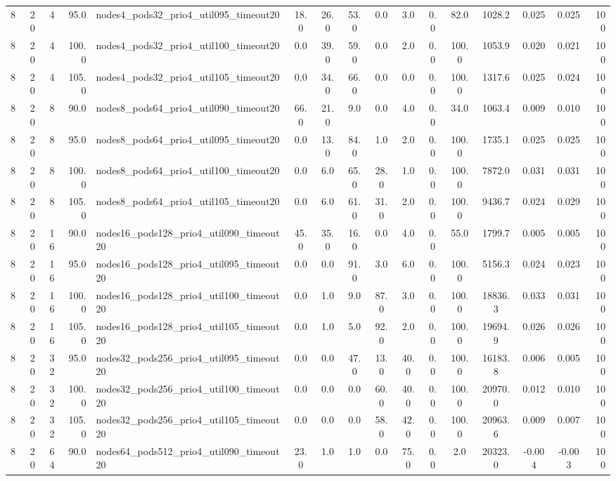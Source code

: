 \begin{tabular}{r r r r l c c c c c c c c c c r}
8 & 20 & 4 & 95.0 & nodes4\_pods32\_prio4\_util095\_timeout20 & 18.0 & 26.0 & 53.0 & 0.0 & 3.0 & 0.0 & 82.0 & 1028.2 & 0.025 & 0.025 & 100 \\
8 & 20 & 4 & 100.0 & nodes4\_pods32\_prio4\_util100\_timeout20 & 0.0 & 39.0 & 59.0 & 0.0 & 2.0 & 0.0 & 100.0 & 1053.9 & 0.020 & 0.021 & 100 \\
8 & 20 & 4 & 105.0 & nodes4\_pods32\_prio4\_util105\_timeout20 & 0.0 & 34.0 & 66.0 & 0.0 & 0.0 & 0.0 & 100.0 & 1317.6 & 0.025 & 0.024 & 100 \\
8 & 20 & 8 & 90.0 & nodes8\_pods64\_prio4\_util090\_timeout20 & 66.0 & 21.0 & 9.0 & 0.0 & 4.0 & 0.0 & 34.0 & 1063.4 & 0.009 & 0.010 & 100 \\
8 & 20 & 8 & 95.0 & nodes8\_pods64\_prio4\_util095\_timeout20 & 0.0 & 13.0 & 84.0 & 1.0 & 2.0 & 0.0 & 100.0 & 1735.1 & 0.025 & 0.025 & 100 \\
8 & 20 & 8 & 100.0 & nodes8\_pods64\_prio4\_util100\_timeout20 & 0.0 & 6.0 & 65.0 & 28.0 & 1.0 & 0.0 & 100.0 & 7872.0 & 0.031 & 0.031 & 100 \\
8 & 20 & 8 & 105.0 & nodes8\_pods64\_prio4\_util105\_timeout20 & 0.0 & 6.0 & 61.0 & 31.0 & 2.0 & 0.0 & 100.0 & 9436.7 & 0.024 & 0.029 & 100 \\
8 & 20 & 16 & 90.0 & nodes16\_pods128\_prio4\_util090\_timeout20 & 45.0 & 35.0 & 16.0 & 0.0 & 4.0 & 0.0 & 55.0 & 1799.7 & 0.005 & 0.005 & 100 \\
8 & 20 & 16 & 95.0 & nodes16\_pods128\_prio4\_util095\_timeout20 & 0.0 & 0.0 & 91.0 & 3.0 & 6.0 & 0.0 & 100.0 & 5156.3 & 0.024 & 0.023 & 100 \\
8 & 20 & 16 & 100.0 & nodes16\_pods128\_prio4\_util100\_timeout20 & 0.0 & 1.0 & 9.0 & 87.0 & 3.0 & 0.0 & 100.0 & 18836.3 & 0.033 & 0.031 & 100 \\
8 & 20 & 16 & 105.0 & nodes16\_pods128\_prio4\_util105\_timeout20 & 0.0 & 1.0 & 5.0 & 92.0 & 2.0 & 0.0 & 100.0 & 19694.9 & 0.026 & 0.026 & 100 \\
8 & 20 & 32 & 95.0 & nodes32\_pods256\_prio4\_util095\_timeout20 & 0.0 & 0.0 & 47.0 & 13.0 & 40.0 & 0.0 & 100.0 & 16183.8 & 0.006 & 0.005 & 100 \\
8 & 20 & 32 & 100.0 & nodes32\_pods256\_prio4\_util100\_timeout20 & 0.0 & 0.0 & 0.0 & 60.0 & 40.0 & 0.0 & 100.0 & 20970.0 & 0.012 & 0.010 & 100 \\
8 & 20 & 32 & 105.0 & nodes32\_pods256\_prio4\_util105\_timeout20 & 0.0 & 0.0 & 0.0 & 58.0 & 42.0 & 0.0 & 100.0 & 20963.6 & 0.009 & 0.007 & 100 \\
8 & 20 & 64 & 90.0 & nodes64\_pods512\_prio4\_util090\_timeout20 & 23.0 & 1.0 & 1.0 & 0.0 & 75.0 & 0.0 & 2.0 & 20323.0 & -0.004 & -0.003 & 100 \\

\end{tabular}
